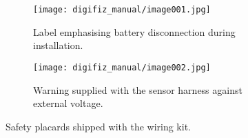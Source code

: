 \begin{figure}[htbp]
    \centering
    \begin{subfigure}{0.46\textwidth}
        \texttt{[image: digifiz\_manual/image001.jpg]}
        \caption{Label emphasising battery disconnection during installation.}
    \end{subfigure}\hfill
    \begin{subfigure}{0.46\textwidth}
        \texttt{[image: digifiz\_manual/image002.jpg]}
        \caption{Warning supplied with the sensor harness against external voltage.}
    \end{subfigure}
    \caption{Safety placards shipped with the wiring kit.}
\end{figure}
